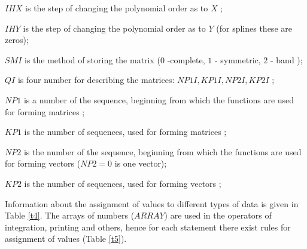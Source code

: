 $IHX$ is the step of changing the polynomial order as to $X$ ;

$IHY$ is the step of changing the polynomial order as to $Y$ (for splines
these are zeros);

$SMI$ is the method of storing the matrix ($0$ -complete, $1$ - symmetric, $%
2 $ - band );

$QI$ is four number for describing the matrices: $NP1I,KP1I,NP2I,KP2I$ ;

$NP1$ is a number of the sequence, beginning from which the functions are
used for forming matrices ;

$KP1$ is the number of sequences, used for forming matrices ;

$NP2$ is the number of the sequence, beginning from which the functions are
used for forming vectors ($NP2=0$ is one vector);

$KP2$ is the number of sequences, used for forming vectors ;

Information about the assignment of values to different types of data is
given in Table \ref{t4}. The arrays of numbers ($ARRAY$) are used in the
operators of integration, printing and others, hence for each statement
there exist rules for assignment of values (Table \ref{t5}).

